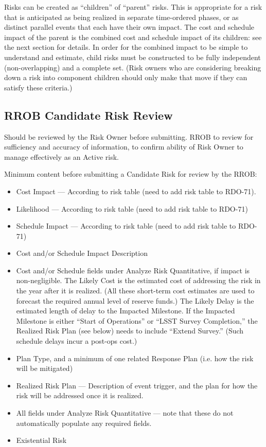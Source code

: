 Risks can be created as ``children'' of ``parent'' risks.
This is appropriate for a risk that is anticipated as being realized in separate time-ordered phases, or as distinct parallel events that each have their own impact.
The cost and schedule impact of the parent is the combined cost and schedule impact of its children: see the next section for details.
In order for the combined impact to be simple to understand and estimate, child risks must be constructed to be fully independent (non-overlapping) and a complete set.
(Risk owners who are considering breaking down a risk into component children should only make that move if they can satisfy these criteria.)

\subsection{RROB Candidate Risk Review}

Should be reviewed by the Risk Owner before submitting.
RROB to review for sufficiency and accuracy of information, to confirm ability of Risk Owner to manage effectively as an Active risk.

Minimum content before submitting a Candidate Risk for review by the RROB:
\begin{itemize}
	\item Cost Impact --- According to risk table (need to add risk table to RDO-71).
	\item Likelihood --- According to risk table (need to add risk table to RDO-71)
	\item Schedule Impact --- According to risk table (need to add risk table to RDO-71)
	\item Cost and/or Schedule Impact Description
	\item Cost and/or Schedule fields under Analyze Risk Quantitative, if impact is non-negligible.
	The Likely Cost is the estimated cost of addressing the risk in the year after it is realized.
	(All these short-term cost estimates are used to forecast the required annual level of reserve funds.)
	The Likely Delay is the estimated length of delay to the Impacted Milestone.
	If the Impacted Milestone is either ``Start of Operations'' or ``LSST Survey Completion,'' the Realized Risk Plan (see below) needs to include ``Extend Survey.''
	(Such schedule delays incur a post-ops cost.)
	\item Plan Type, and a minimum of one related Response Plan (i.e. how the risk will be mitigated)
	\item Realized Risk Plan --- Description of event trigger, and the plan for how the risk will be addressed once it is realized.
	\item All fields under Analyze Risk Quantitative --- note that these do not automatically populate any required fields.
	\item Existential Risk
\end{itemize}

